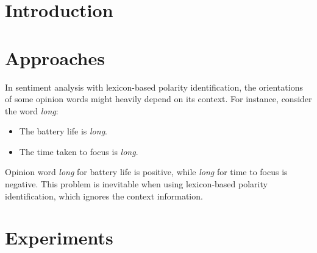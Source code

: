 \documentclass[12pt,a4paper]{article}
\theoremstyle{definition}
\begin{document}
\noindent
\noindent{}
\vspace{-1.5\baselineskip}
\section{Introduction} %

\vspace{-1\baselineskip}
\section{Approaches~\cite{levine2016learning}}
	In sentiment analysis with lexicon-based polarity identification, the orientations of some opinion words might heavily depend on its context. For instance, consider the word \emph{long}:
\begin{itemize}
	\item The battery life is \emph{long}.
	\item The time taken to focus is \emph{long}.
\end{itemize}

	Opinion word \emph{long} for battery life is positive, while \emph{long} for time to focus is negative. This problem is inevitable when using lexicon-based polarity identification, which ignores the context information.

\section{Experiments}
\end{document}
